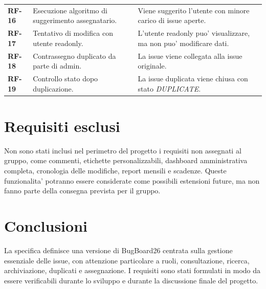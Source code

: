 \documentclass[12pt,a4paper]{article}
\begin{document}
\begin{longtable}{>{\bfseries}p{} p{} p{}}
RF-16 & Esecuzione algoritmo di suggerimento assegnatario. & Viene suggerito l'utente con minore carico di issue aperte. \\
RF-17 & Tentativo di modifica con utente readonly. & L'utente readonly puo' visualizzare, ma non puo' modificare dati. \\
RF-18 & Contrassegno duplicato da parte di admin. & La issue viene collegata alla issue originale. \\
RF-19 & Controllo stato dopo duplicazione. & La issue duplicata viene chiusa con stato \textit{DUPLICATE}. \\
\bottomrule
\end{longtable}

\section{Requisiti esclusi}

Non sono stati inclusi nel perimetro del progetto i requisiti non assegnati al gruppo, come commenti, etichette personalizzabili, dashboard amministrativa completa, cronologia delle modifiche, report mensili e scadenze. Queste funzionalita' potranno essere considerate come possibili estensioni future, ma non fanno parte della consegna prevista per il gruppo.

\section{Conclusioni}

La specifica definisce una versione di BugBoard26 centrata sulla gestione essenziale delle issue, con attenzione particolare a ruoli, consultazione, ricerca, archiviazione, duplicati e assegnazione. I requisiti sono stati formulati in modo da essere verificabili durante lo sviluppo e durante la discussione finale del progetto.
\end{document}
